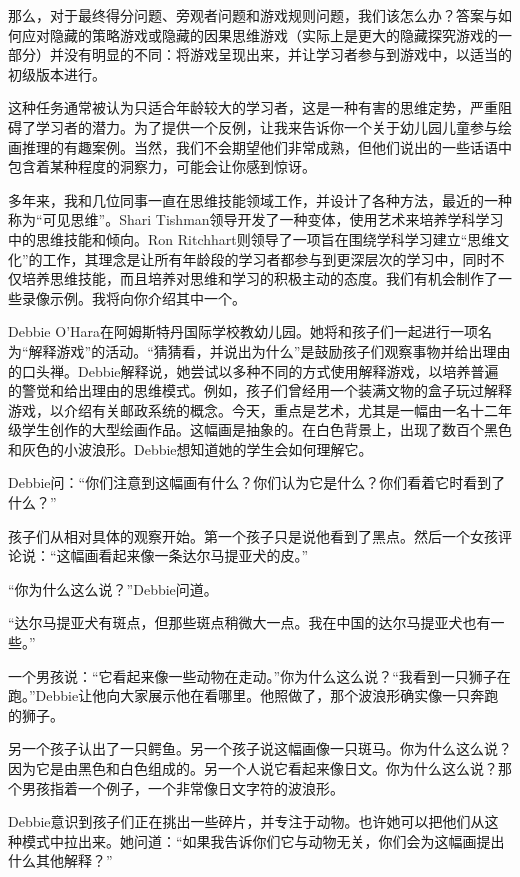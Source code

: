 那么，对于最终得分问题、旁观者问题和游戏规则问题，我们该怎么办？答案与如何应对隐藏的策略游戏或隐藏的因果思维游戏（实际上是更大的隐藏探究游戏的一部分）并没有明显的不同：将游戏呈现出来，并让学习者参与到游戏中，以适当的初级版本进行。

这种任务通常被认为只适合年龄较大的学习者，这是一种有害的思维定势，严重阻碍了学习者的潜力。为了提供一个反例，让我来告诉你一个关于幼儿园儿童参与绘画推理的有趣案例。当然，我们不会期望他们非常成熟，但他们说出的一些话语中包含着某种程度的洞察力，可能会让你感到惊讶。

多年来，我和几位同事一直在思维技能领域工作，并设计了各种方法，最近的一种称为“可见思维”。Shari Tishman领导开发了一种变体，使用艺术来培养学科学习中的思维技能和倾向。Ron Ritchhart则领导了一项旨在围绕学科学习建立“思维文化”的工作，其理念是让所有年龄段的学习者都参与到更深层次的学习中，同时不仅培养思维技能，而且培养对思维和学习的积极主动的态度。我们有机会制作了一些录像示例。我将向你介绍其中一个。

Debbie O’Hara在阿姆斯特丹国际学校教幼儿园。她将和孩子们一起进行一项名为“解释游戏”的活动。“猜猜看，并说出为什么”是鼓励孩子们观察事物并给出理由的口头禅。Debbie解释说，她尝试以多种不同的方式使用解释游戏，以培养普遍的警觉和给出理由的思维模式。例如，孩子们曾经用一个装满文物的盒子玩过解释游戏，以介绍有关邮政系统的概念。今天，重点是艺术，尤其是一幅由一名十二年级学生创作的大型绘画作品。这幅画是抽象的。在白色背景上，出现了数百个黑色和灰色的小波浪形。Debbie想知道她的学生会如何理解它。

Debbie问：“你们注意到这幅画有什么？你们认为它是什么？你们看着它时看到了什么？”

孩子们从相对具体的观察开始。第一个孩子只是说他看到了黑点。然后一个女孩评论说：“这幅画看起来像一条达尔马提亚犬的皮。”

“你为什么这么说？”Debbie问道。

“达尔马提亚犬有斑点，但那些斑点稍微大一点。我在中国的达尔马提亚犬也有一些。”

一个男孩说：“它看起来像一些动物在走动。”你为什么这么说？“我看到一只狮子在跑。”Debbie让他向大家展示他在看哪里。他照做了，那个波浪形确实像一只奔跑的狮子。

另一个孩子认出了一只鳄鱼。另一个孩子说这幅画像一只斑马。你为什么这么说？因为它是由黑色和白色组成的。另一个人说它看起来像日文。你为什么这么说？那个男孩指着一个例子，一个非常像日文字符的波浪形。

Debbie意识到孩子们正在挑出一些碎片，并专注于动物。也许她可以把他们从这种模式中拉出来。她问道：“如果我告诉你们它与动物无关，你们会为这幅画提出什么其他解释？”

